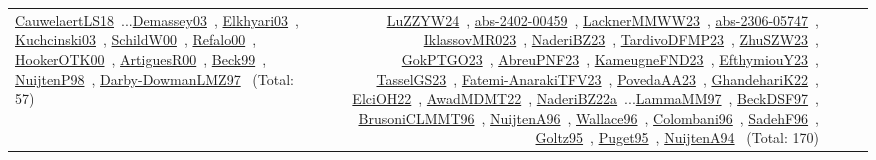 {\begin{longtable}{p{3cm}r>{\raggedright\arraybackslash}p{6cm}>{\raggedright\arraybackslash}p{6cm}>{\raggedright\arraybackslash}p{8cm}}
\href{../works/CauwelaertLS18.pdf}{CauwelaertLS18}~\cite{CauwelaertLS18}...\href{../works/Demassey03.pdf}{Demassey03}~\cite{Demassey03}, \href{../works/Elkhyari03.pdf}{Elkhyari03}~\cite{Elkhyari03}, \href{../works/Kuchcinski03.pdf}{Kuchcinski03}~\cite{Kuchcinski03}, \href{../works/SchildW00.pdf}{SchildW00}~\cite{SchildW00}, \href{../works/Refalo00.pdf}{Refalo00}~\cite{Refalo00}, \href{../works/HookerOTK00.pdf}{HookerOTK00}~\cite{HookerOTK00}, \href{../works/ArtiguesR00.pdf}{ArtiguesR00}~\cite{ArtiguesR00}, \href{../works/Beck99.pdf}{Beck99}~\cite{Beck99}, \href{../works/NuijtenP98.pdf}{NuijtenP98}~\cite{NuijtenP98}, \href{../works/Darby-DowmanLMZ97.pdf}{Darby-DowmanLMZ97}~\cite{Darby-DowmanLMZ97} (Total: 57) & \href{../works/LuZZYW24.pdf}{LuZZYW24}~\cite{LuZZYW24}, \href{../works/abs-2402-00459.pdf}{abs-2402-00459}~\cite{abs-2402-00459}, \href{../works/LacknerMMWW23.pdf}{LacknerMMWW23}~\cite{LacknerMMWW23}, \href{../works/abs-2306-05747.pdf}{abs-2306-05747}~\cite{abs-2306-05747}, \href{../works/IklassovMR023.pdf}{IklassovMR023}~\cite{IklassovMR023}, \href{../works/NaderiBZ23.pdf}{NaderiBZ23}~\cite{NaderiBZ23}, \href{../works/TardivoDFMP23.pdf}{TardivoDFMP23}~\cite{TardivoDFMP23}, \href{../works/ZhuSZW23.pdf}{ZhuSZW23}~\cite{ZhuSZW23}, \href{../works/GokPTGO23.pdf}{GokPTGO23}~\cite{GokPTGO23}, \href{../works/AbreuPNF23.pdf}{AbreuPNF23}~\cite{AbreuPNF23}, \href{../works/KameugneFND23.pdf}{KameugneFND23}~\cite{KameugneFND23}, \href{../works/EfthymiouY23.pdf}{EfthymiouY23}~\cite{EfthymiouY23}, \href{../works/TasselGS23.pdf}{TasselGS23}~\cite{TasselGS23}, \href{../works/Fatemi-AnarakiTFV23.pdf}{Fatemi-AnarakiTFV23}~\cite{Fatemi-AnarakiTFV23}, \href{../works/PovedaAA23.pdf}{PovedaAA23}~\cite{PovedaAA23}, \href{../works/GhandehariK22.pdf}{GhandehariK22}~\cite{GhandehariK22}, \href{../works/ElciOH22.pdf}{ElciOH22}~\cite{ElciOH22}, \href{../works/AwadMDMT22.pdf}{AwadMDMT22}~\cite{AwadMDMT22}, \href{../works/NaderiBZ22a.pdf}{NaderiBZ22a}~\cite{NaderiBZ22a}...\href{../works/LammaMM97.pdf}{LammaMM97}~\cite{LammaMM97}, \href{../works/BeckDSF97.pdf}{BeckDSF97}~\cite{BeckDSF97}, \href{../works/BrusoniCLMMT96.pdf}{BrusoniCLMMT96}~\cite{BrusoniCLMMT96}, \href{../works/NuijtenA96.pdf}{NuijtenA96}~\cite{NuijtenA96}, \href{../works/Wallace96.pdf}{Wallace96}~\cite{Wallace96}, \href{../works/Colombani96.pdf}{Colombani96}~\cite{Colombani96}, \href{../works/SadehF96.pdf}{SadehF96}~\cite{SadehF96}, \href{../works/Goltz95.pdf}{Goltz95}~\cite{Goltz95}, \href{../works/Puget95.pdf}{Puget95}~\cite{Puget95}, \href{../works/NuijtenA94.pdf}{NuijtenA94}~\cite{NuijtenA94} (Total: 170)\\

\end{longtable}}
